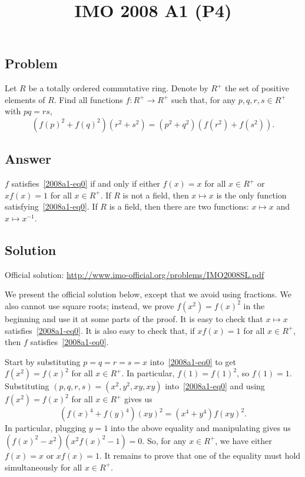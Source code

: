 \documentclass{article}
\title{IMO 2008 A1 (P4)}
\author{}
\date{}
\begin{document}
\maketitle



\subsection*{Problem}

Let $R$ be a totally ordered commutative ring.
Denote by $R^+$ the set of positive elements of $R$.
Find all functions $f : R^+ \to R^+$ such that, for any $p, q, r, s \in R^+$ with $pq = rs$,
\[ (f(p)^2 + f(q)^2) (r^2 + s^2) = (p^2 + q^2) (f(r^2) + f(s^2)). \tag{*}\label{2008a1-eq0} \]



\subsection*{Answer}

$f$ satisfies~\eqref{2008a1-eq0} if and only if either $f(x) = x$ for all $x \in R^+$ or $x f(x) = 1$ for all $x \in R^+$.
If $R$ is not a field, then $x \mapsto x$ is the only function satisfying~\eqref{2008a1-eq0}.
If $R$ is a field, then there are two functions: $x \mapsto x$ and $x \mapsto x^{-1}$.



\subsection*{Solution}

Official solution: \url{http://www.imo-official.org/problems/IMO2008SL.pdf}

We present the official solution below, except that we avoid using fractions.
We also cannot use square roots; instead, we prove $f(x^2) = f(x)^2$ in the beginning and use it at some parts of the proof.
It is easy to check that $x \mapsto x$ satisfies~\eqref{2008a1-eq0}.
It is also easy to check that, if $x f(x) = 1$ for all $x \in R^+$, then $f$ satisfies~\eqref{2008a1-eq0}.

Start by substituting $p = q = r = s = x$ into~\eqref{2008a1-eq0} to get $f(x^2) = f(x)^2$ for all $x \in R^+$.
In particular, $f(1) = f(1)^2$, so $f(1) = 1$.
Substituting $(p, q, r, s) = (x^2, y^2, xy, xy)$ into~\eqref{2008a1-eq0} and using $f(x^2) = f(x)^2$ for all $x \in R^+$ gives us
\[ (f(x)^4 + f(y)^4) (xy)^2 = (x^4 + y^4) f(xy)^2. \tag{1}\label{2008a1-eq1} \]
In particular, plugging $y = 1$ into the above equality and manipulating gives us $(f(x)^2 - x^2) (x^2 f(x)^2 - 1) = 0$.
So, for any $x \in R^+$, we have either $f(x) = x$ or $x f(x) = 1$.
It remains to prove that one of the equality must hold simultaneously for all $x \in R^+$.
\end{document}
